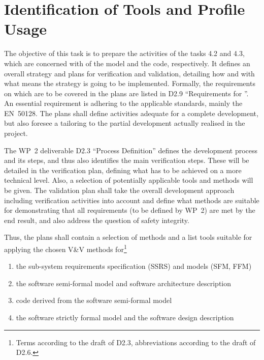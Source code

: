 \section{Identification of Tools and Profile Usage}
The objective of this task is to prepare the activities of the tasks
4.2 and 4.3, which are concerned with \vv of the model and the code,
respectively. It defines an overall \vv strategy and plans for
verification and validation, detailing how and with what means the
strategy is going to be implemented. Formally, the requirements on \vv
which are to be covered in the plans are listed in D2.9 ``Requirements
for \VV''. An essential requirement is adhering to
the applicable standards, mainly the EN~50128. The plans shall define
activities adequate for a complete development, but also foresee a
tailoring to the partial development actually realised in the project.

The WP~2 deliverable D2.3 ``Process Definition'' defines the
development process and its steps, and thus also identifies the main
verification steps. These will be detailed in the verification plan,
defining what has to be achieved on a more technical level. Also, a
selection of potentially applicable tools and methods will be
given. The validation plan shall take the overall development approach
including verification activities into account and define what methods
are suitable for demonstrating that all requirements (to be defined by
WP~2) are met by the end result, and also address the question of
safety integrity.

Thus, the plans shall contain a selection of methods and a list tools
suitable for applying the chosen V\&V methods for\footnote{Terms
  according to the draft of D2.3, abbreviations according to the draft
  of D2.6.}
\begin{enumerate}
\item the sub-system requirements specification (SSRS) and models
  (SFM, FFM)
\item the software semi-formal model and software architecture
  description
\item code derived from the software semi-formal model
\item the software strictly formal model and the software design
  description
\end{enumerate}

